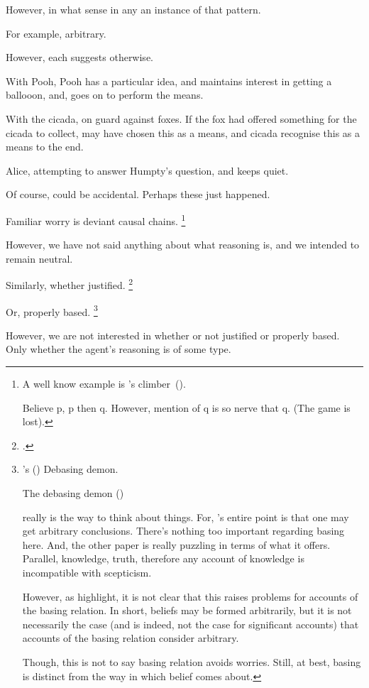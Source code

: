 \begin{note}
  However, in what sense in any  an instance of that pattern.

  For example, arbitrary.

  However, each  suggests otherwise.

  With Pooh, Pooh has a particular idea, and maintains interest in getting a ballooon, and, goes on to perform the means.

  With the cicada, on guard against foxes.
  If the fox had offered something for the cicada to collect, may have chosen this as a means, and cicada recognise this as a means to the end.

  Alice, attempting to answer Humpty's question, and keeps quiet.

  Of course, could be accidental.
  Perhaps these  just happened.
\end{note}

\begin{note}
  Familiar worry is deviant causal chains.%
  \footnote{
    A well know example is \citeauthor{Davidson:1973vd}'s climber~(\citeyear[79]{Davidson:1973vd}).

    Believe p, p then q.
    However, mention of q is so nerve that q.
    (The game is lost).
  }

  However, we have not said anything about what reasoning is, and we intended to remain neutral.

  Similarly, whether justified.%
  \footnote{
    \citeauthor{Kripke:1982aa}.
  }

  Or, properly based.%
  \footnote{
    \citeauthor{Schaffer:2010vq}'s (\citeyear{Schaffer:2010vq}) Debasing demon.

    The debasing demon  (\citeyear[231]{Schaffer:2010vq})

    \citeauthor{Schaffer:2010vq} really is the way to think about things.
    For, \citeauthor{Schaffer:2010vq}'s entire point is that one may get arbitrary conclusions.
    There's nothing too important regarding basing here.
    And, the other paper is really puzzling in terms of what it offers.
    Parallel, knowledge, truth, therefore any account of knowledge is incompatible with scepticism.

    However, as \textcite{Bondy:2018tk} highlight, it is not clear that this raises problems for accounts of the basing relation.
    In short, beliefs may be formed arbitrarily, but it is not necessarily the case (and is indeed, not the case for significant accounts) that accounts of the basing relation consider arbitrary.

    Though, this is not to say basing relation avoids worries.
    Still, at best, basing is distinct from the way in which belief comes about.
  }

  However, we are not interested in whether or not justified or properly based.
  Only whether the agent's reasoning is of some type.
\end{note}

